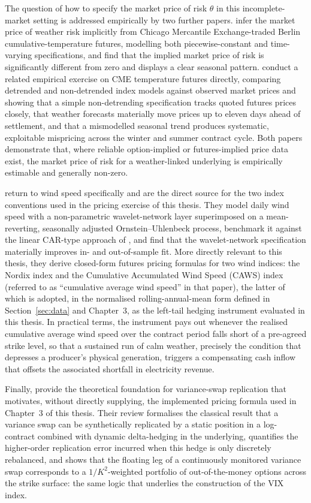 \documentclass[11pt, a4paper, twoside]{article}
\begin{document}
The question of how to specify the market price of risk $\theta$ in this incomplete-market setting is addressed empirically by two further papers. \citet{HardleLopezCabrera2009} infer the market price of weather risk implicitly from Chicago Mercantile Exchange-traded Berlin cumulative-temperature futures, modelling both piecewise-constant and time-varying specifications, and find that the implied market price of risk is significantly different from zero and displays a clear seasonal pattern. \citet{DorfleitnerWimmer2010} conduct a related empirical exercise on CME temperature futures directly, comparing detrended and non-detrended index models against observed market prices and showing that a simple non-detrending specification tracks quoted futures prices closely, that weather forecasts materially move prices up to eleven days ahead of settlement, and that a mismodelled seasonal trend produces systematic, exploitable mispricing across the winter and summer contract cycle. Both papers demonstrate that, where reliable option-implied or futures-implied price data exist, the market price of risk for a weather-linked underlying is empirically estimable and generally non-zero.

\citet{AlexandridisZapranis2013} return to wind speed specifically and are the direct source for the two index conventions used in the pricing exercise of this thesis. They model daily wind speed with a non-parametric wavelet-network layer superimposed on a mean-reverting, seasonally adjusted Ornstein--Uhlenbeck process, benchmark it against the linear CAR-type approach of \citet{BenthSaltyteBenth2009}, and find that the wavelet-network specification materially improves in- and out-of-sample fit. More directly relevant to this thesis, they derive closed-form futures pricing formulas for two wind indices: the Nordix index and the Cumulative Accumulated Wind Speed (CAWS) index (referred to as ``cumulative average wind speed'' in that paper), the latter of which is adopted, in the normalised rolling-annual-mean form defined in Section~\ref{sec:data} and Chapter~3, as the left-tail hedging instrument evaluated in this thesis. In practical terms, the instrument pays out whenever the realised cumulative average wind speed over the contract period falls short of a pre-agreed strike level, so that a sustained run of calm weather, precisely the condition that depresses a producer's physical generation, triggers a compensating cash inflow that offsets the associated shortfall in electricity revenue.

Finally, \citet{CarrLee2009} provide the theoretical foundation for variance-swap replication that motivates, without directly supplying, the implemented pricing formula used in Chapter~3 of this thesis. Their review formalises the classical result that a variance swap can be synthetically replicated by a static position in a log-contract combined with dynamic delta-hedging in the underlying, quantifies the higher-order replication error incurred when this hedge is only discretely rebalanced, and shows that the floating leg of a continuously monitored variance swap corresponds to a $1/K^2$-weighted portfolio of out-of-the-money options across the strike surface: the same logic that underlies the construction of the VIX index.
\end{document}
